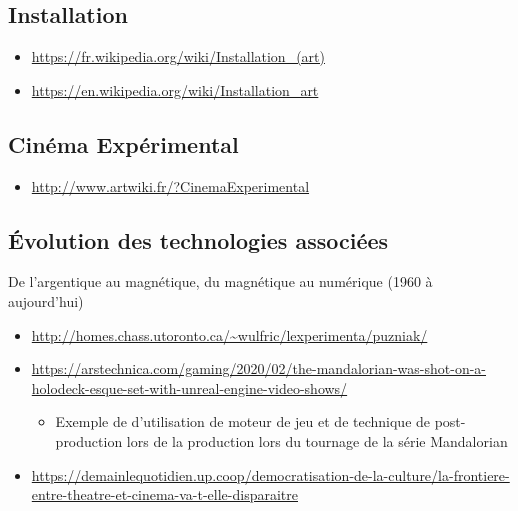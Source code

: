 \documentclass[
]{book}
\providecommand{\tightlist}{%
  \setlength{\itemsep}{0pt}\setlength{\parskip}{0pt}}
\begin{document}
\hypertarget{evolution_historique_installation}{%
\subsection{Installation}\label{evolution_historique_installation}}

\begin{itemize}
\tightlist
\item
  \url{https://fr.wikipedia.org/wiki/Installation_(art)}
\item
  \url{https://en.wikipedia.org/wiki/Installation_art}
\end{itemize}

\hypertarget{cinuxe9ma-expuxe9rimental}{%
\subsection{Cinéma Expérimental}\label{cinuxe9ma-expuxe9rimental}}

\begin{itemize}
\tightlist
\item
  \url{http://www.artwiki.fr/?CinemaExperimental}
\end{itemize}

\hypertarget{evolution_historique_technologies}{%
\subsection{Évolution des technologies associées}\label{evolution_historique_technologies}}

De l'argentique au magnétique, du magnétique au numérique (1960 à aujourd'hui)

\begin{itemize}
\item
  \url{http://homes.chass.utoronto.ca/~wulfric/lexperimenta/puzniak/}
\item
  \url{https://arstechnica.com/gaming/2020/02/the-mandalorian-was-shot-on-a-holodeck-esque-set-with-unreal-engine-video-shows/}

  \begin{itemize}
  \tightlist
  \item
    Exemple de d'utilisation de moteur de jeu et de technique de post-production lors de la production lors du tournage de la série Mandalorian
  \end{itemize}
\item
  \url{https://demainlequotidien.up.coop/democratisation-de-la-culture/la-frontiere-entre-theatre-et-cinema-va-t-elle-disparaitre}
\end{itemize}
\end{document}
